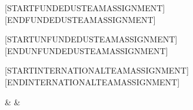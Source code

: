 [STARTFUNDEDUSTEAMASSIGNMENT]
\FundedUsTeam{[TEAMID]}\,\FundedUsTeam{[NUMBERWEEKS]}
[ENDFUNDEDUSTEAMASSIGNMENT]
 
[STARTUNFUNDEDUSTEAMASSIGNMENT]
\UnfundedUsTeam{[TEAMID]}\,\UnfundedUsTeam{[NUMBERWEEKS]} 
[ENDUNFUNDEDUSTEAMASSIGNMENT]

[STARTINTERNATIONALTEAMASSIGNMENT]
\InternationalTeam{[TEAMID]}\,\InternationalTeam{[NUMBERWEEKS]} 
[ENDINTERNATIONALTEAMASSIGNMENT]

\FteTotalFormat{[INSERTFTETOTAL]} & \FteUnfundedFormat{[INSERTFTEUNFUNDED]} & \FteFundedFormat{[INSERTFTEFUNDED]}\\
[ENDTASKROW] 
\hline
[ENDCATEGORYSECTION]
